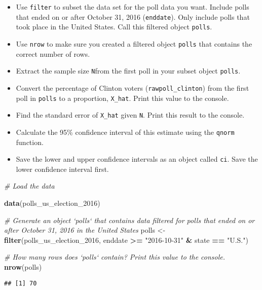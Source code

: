 \documentclass[]{article}
\newenvironment{Shaded}{\begin{snugshade}}{\end{snugshade}}
\newcommand{\KeywordTok}[1]{\textcolor[rgb]{0.13,0.29,0.53}{\textbf{#1}}}
\newcommand{\DecValTok}[1]{\textcolor[rgb]{0.00,0.00,0.81}{#1}}
\newcommand{\StringTok}[1]{\textcolor[rgb]{0.31,0.60,0.02}{#1}}
\newcommand{\CommentTok}[1]{\textcolor[rgb]{0.56,0.35,0.01}{\textit{#1}}}
\newcommand{\OperatorTok}[1]{\textcolor[rgb]{0.81,0.36,0.00}{\textbf{#1}}}
\newcommand{\NormalTok}[1]{#1}
\providecommand{\tightlist}{%
  \setlength{\itemsep}{0pt}\setlength{\parskip}{0pt}}
\begin{document}
\begin{itemize}
\tightlist
\item
  Use \texttt{filter} to subset the data set for the poll data you want.
  Include polls that ended on or after October 31, 2016
  (\texttt{enddate}). Only include polls that took place in the United
  States. Call this filtered object \texttt{polls}.
\item
  Use \texttt{nrow} to make sure you created a filtered object
  \texttt{polls} that contains the correct number of rows.
\item
  Extract the sample size \texttt{N}from the first poll in your subset
  object \texttt{polls}.
\item
  Convert the percentage of Clinton voters (\texttt{rawpoll\_clinton})
  from the first poll in \texttt{polls} to a proportion,
  \texttt{X\_hat}. Print this value to the console.
\item
  Find the standard error of \texttt{X\_hat} given \texttt{N}. Print
  this result to the console.
\item
  Calculate the 95\% confidence interval of this estimate using the
  \texttt{qnorm} function.
\item
  Save the lower and upper confidence intervals as an object called
  \texttt{ci}. Save the lower confidence interval first.
\end{itemize}

\begin{Shaded}
\begin{Highlighting}[]
\CommentTok{# Load the data}

\KeywordTok{data}\NormalTok{(polls_us_election_}\DecValTok{2016}\NormalTok{)}

\CommentTok{# Generate an object `polls` that contains data filtered for polls that ended on or after October 31, 2016 in the United States}
\NormalTok{polls <-}\StringTok{ }\KeywordTok{filter}\NormalTok{(polls_us_election_}\DecValTok{2016}\NormalTok{, enddate }\OperatorTok{>=}\StringTok{ "2016-10-31"} \OperatorTok{&}\StringTok{ }\NormalTok{state }\OperatorTok{==}\StringTok{ "U.S."}\NormalTok{)}

\CommentTok{# How many rows does `polls` contain? Print this value to the console.}
\KeywordTok{nrow}\NormalTok{(polls)}
\end{Highlighting}
\end{Shaded}

\begin{verbatim}
## [1] 70
\end{verbatim}
\end{document}
